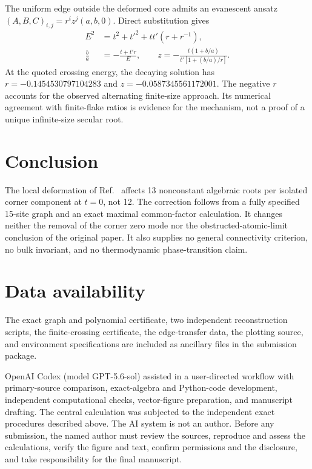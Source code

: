 \documentclass[aps,prb,reprint,amsmath,amssymb,longbibliography]{revtex4-2}
\begin{document}
The uniform edge outside the deformed core admits an evanescent ansatz
$(A,B,C)_{i,j}=r^iz^j(a,b,0)$.  Direct substitution gives
\begin{align}
 E^2&=t^2+t'^2+tt'(r+r^{-1}),\nonumber\\
 \frac{b}{a}&=-\frac{t+t'r}{E},\qquad
 z=-\frac{t(1+b/a)}{t'[1+(b/a)/r]}.
 \label{eq:transfer}
\end{align}
At the quoted crossing energy, the decaying solution has
$r=-0.1454530797104283$ and $z=-0.0587345561172001$.  The negative $r$
accounts for the observed alternating finite-size approach.  Its numerical
agreement with finite-flake ratios is evidence for the mechanism, not a proof
of a unique infinite-size secular root.

\section{Conclusion}

The local deformation of Ref.~\cite{Geschner2026} affects 13 nonconstant
algebraic roots per isolated corner component at $t=0$, not 12.  The
correction follows from a fully specified 15-site graph and an exact maximal
common-factor calculation.  It changes neither the removal of the corner
zero mode nor the obstructed-atomic-limit conclusion of the original paper.
It also supplies no general connectivity criterion, no bulk invariant, and
no thermodynamic phase-transition claim.

\section*{Data availability}

The exact graph and polynomial certificate, two independent reconstruction
scripts, the finite-crossing certificate, the edge-transfer data, the plotting
source, and environment specifications are included as ancillary files in the
submission package.

\begin{acknowledgments}
OpenAI Codex (model GPT-5.6-sol) assisted in a user-directed workflow with
primary-source comparison, exact-algebra and Python-code development,
independent computational checks, vector-figure preparation, and manuscript
drafting.  The central calculation was subjected to the independent exact
procedures described above.  The AI system is not an author.  Before any
submission, the named author must review the sources, reproduce and assess the
calculations, verify the figure and text, confirm permissions and the
disclosure, and take responsibility for the final manuscript.
\end{acknowledgments}


\end{document}
